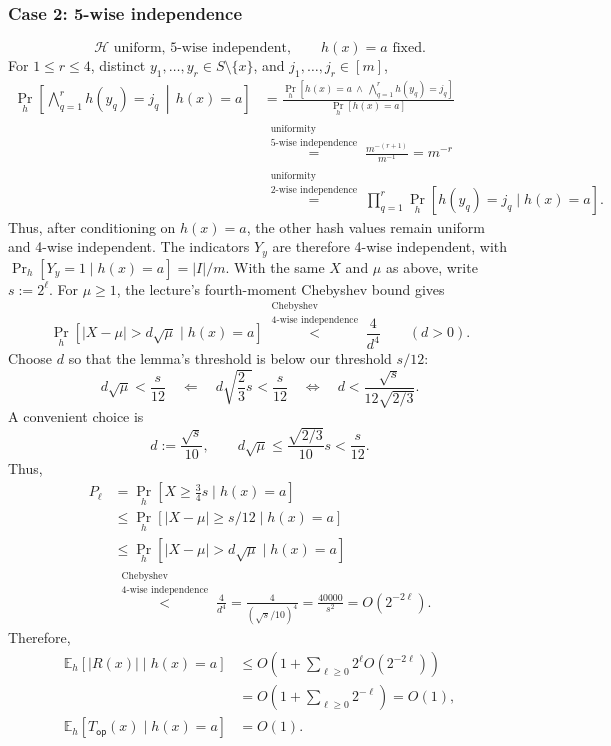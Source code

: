 \documentclass[12pt,a4paper]{article}
\begin{document}
\subsubsection*{Case 2: 5-wise independence}
\[
\mathcal H\text{ uniform, 5-wise independent},\qquad h(x)=a\text{ fixed}.
\]
For $1\leq r\leq4$, distinct $y_1,\ldots,y_r\in S\setminus\{x\}$, and
$j_1,\ldots,j_r\in[m]$,
\[
\begin{aligned}
\Pr_h\!\left[\bigwedge_{q=1}^{r}h(y_q)=j_q\,\middle|\,h(x)=a\right]
&=\frac{\Pr_h\!\left[h(x)=a\ \land\ \bigwedge_{q=1}^{r}h(y_q)=j_q\right]}
 {\Pr_h[h(x)=a]}\\
&\overset{\substack{\text{uniformity}\\\text{5-wise independence}}}{=}
\frac{m^{-(r+1)}}{m^{-1}}
=m^{-r}\\
&\overset{\substack{\text{uniformity}\\\text{2-wise independence}}}{=}
\prod_{q=1}^{r}\Pr_h[h(y_q)=j_q\mid h(x)=a].
\end{aligned}
\]
Thus, after conditioning on $h(x)=a$, the other hash values remain uniform
and 4-wise independent. The indicators $Y_y$ are therefore 4-wise independent,
with $\Pr_h[Y_y=1\mid h(x)=a]=|I|/m$.
With the same $X$ and $\mu$ as above, write $s:=2^\ell$.
For $\mu\geq1$, the lecture's fourth-moment Chebyshev bound gives
\[
\Pr_h[|X-\mu|>d\sqrt\mu\mid h(x)=a]
\overset{\substack{\text{Chebyshev}\\\text{4-wise independence}}}{<}
\frac4{d^4}\qquad(d>0).
\]
Choose $d$ so that the lemma's threshold is below our threshold $s/12$:
\[
d\sqrt\mu<\frac{s}{12}
\quad\Longleftarrow\quad
d\sqrt{\frac23s}<\frac{s}{12}
\quad\Longleftrightarrow\quad
d<\frac{\sqrt s}{12\sqrt{2/3}}.
\]
A convenient choice is
\[
d:=\frac{\sqrt s}{10},\qquad
d\sqrt\mu\leq\frac{\sqrt{2/3}}{10}s<\frac{s}{12}.
\]
Thus,
\[
\begin{aligned}
P_\ell
&=\Pr_h[X\geq\tfrac34s\mid h(x)=a]\\
&\leq\Pr_h[|X-\mu|\geq s/12\mid h(x)=a]\\
&\leq\Pr_h[|X-\mu|>d\sqrt\mu\mid h(x)=a]\\
&\overset{\substack{\text{Chebyshev}\\\text{4-wise independence}}}{<}
\frac4{d^4}
=\frac4{(\sqrt s/10)^4}
=\frac{40000}{s^2}
=O(2^{-2\ell}).
\end{aligned}
\]
Therefore,
\[
\begin{aligned}
\mathbb E_h[|R(x)|\mid h(x)=a]
&\leq O\!\left(1+\sum_{\ell\geq0}2^\ell O(2^{-2\ell})\right)\\
&=O\!\left(1+\sum_{\ell\geq0}2^{-\ell}\right)
=O(1),\\
\mathbb E_h[T_{\mathsf{op}}(x)\mid h(x)=a]&=O(1).
\end{aligned}
\]
\end{document}
